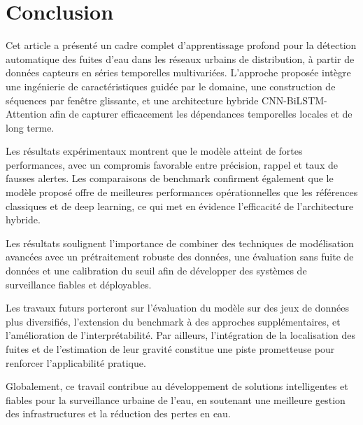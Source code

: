 \section{Conclusion}

\noindent Cet article a présenté un cadre complet d'apprentissage profond pour la
détection automatique des fuites d'eau dans les réseaux urbains de distribution,
à partir de données capteurs en séries temporelles multivariées. L'approche
proposée intègre une ingénierie de caractéristiques guidée par le domaine, une
construction de séquences par fenêtre glissante, et une architecture hybride
CNN-BiLSTM-Attention afin de capturer efficacement les dépendances temporelles
locales et de long terme.

\vspace{0.2cm}

\noindent Les résultats expérimentaux montrent que le modèle atteint de fortes
performances, avec un compromis favorable entre précision, rappel et taux de
fausses alertes. Les comparaisons de benchmark confirment également que le
modèle proposé offre de meilleures performances opérationnelles que les
références classiques et de deep learning, ce qui met en évidence l'efficacité
de l'architecture hybride.

\vspace{0.2cm}

\noindent Les résultats soulignent l'importance de combiner des techniques de
modélisation avancées avec un prétraitement robuste des données, une évaluation
sans fuite de données et une calibration du seuil afin de développer des
systèmes de surveillance fiables et déployables.

\vspace{0.2cm}

\noindent Les travaux futurs porteront sur l'évaluation du modèle sur des jeux de
données plus diversifiés, l'extension du benchmark à des approches
supplémentaires, et l'amélioration de l'interprétabilité. Par ailleurs,
l'intégration de la localisation des fuites et de l'estimation de leur gravité
constitue une piste prometteuse pour renforcer l'applicabilité pratique.

\vspace{0.2cm}

\noindent Globalement, ce travail contribue au développement de solutions
intelligentes et fiables pour la surveillance urbaine de l'eau, en soutenant une
meilleure gestion des infrastructures et la réduction des pertes en eau.


